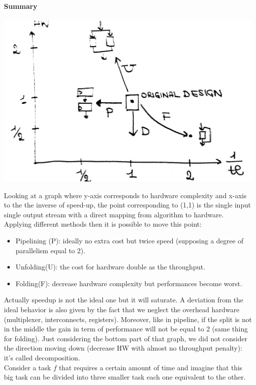 \paragraph{Summary}
\begin{center}
  \includegraphics[width=0.7\linewidth]{img/img1/40}
\end{center}

Looking at a graph where y-axis corresponds to hardware complexity and x-axis to the the inverse of speed-up, the point corresponding to (1,1) is the single input single output stream with a direct mapping from algorithm to hardware. Applying different methods then it is possible to move this point:
\begin{itemize}
  \item Pipelining (P): ideally no extra cost but twice speed (supposing a degree of parallelism equal to 2).
  \item Unfolding(U): the cost for hardware double as the throughput.
  \item Folding(F): decrease hardware complexity but performances become worst.
\end{itemize}

Actually speedup is not the ideal one but it will saturate. A deviation from the ideal behavior is also given by the fact that we neglect the overhead hardware (multiplexer, interconnects, registers). Moreover, like in pipeline, if the split is not in the middle the gain in term of performance will not be equal to 2 (same thing for folding). Just considering the bottom part of that graph, we did not consider the direction moving down (decrease HW with almost no throughput penalty): it's called decomposition.\\

Consider a task $f$ that requires a certain amount of time and imagine that this big task can be divided into three smaller task each one equivalent to the other.

